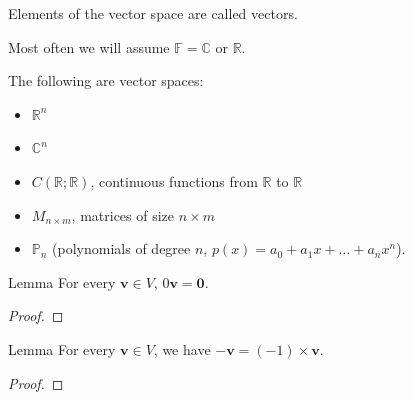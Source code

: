 \documentclass [aspectratio=169]{beamer}
\newcommand{\bv}{{\mathbf{v}}}
\newcommand{\zerovec}{{\mathbf{0}}}
\newcommand{\R}{{\mathbb{R}}}
\newcommand{\C}{{\mathbb{C}}}
\begin{document}
\begin{frame}
Elements of the vector space are called vectors.

Most often we will assume $\mathbb{F} = \mathbb{C}$ or $\R$.

\vspace{1em}

\begin{example}
The following are vector spaces:
\begin{itemize}
\item $\R^n$
\item $\C^n$
\item $C(\R;\R)$, continuous functions from $\R$ to $\R$
\item $M_{n \times m}$, matrices of size $n \times m$
\item $\mathbb{P}_n$ (polynomials of degree $n$, $p(x) = a_0 + a_1 x + \ldots + a_n x^n$).
\end{itemize}
\end{example}

\end{frame}


\begin{frame}
\begin{alertblock}{Lemma}
For every $\bv \in V$, $0 \bv= \zerovec$.
\end{alertblock}

\vspace{0.5em}

\begin{proof}
\vspace{3cm}
\end{proof}

\end{frame}

\begin{frame}
\begin{alertblock}{Lemma}
For every $\bv \in V$, we have $-\bv = (-1) \times \bv$.
\end{alertblock}

\vspace{0.5em}

\begin{proof}
\vspace{3cm}
\end{proof}

\end{frame}
\end{document}
